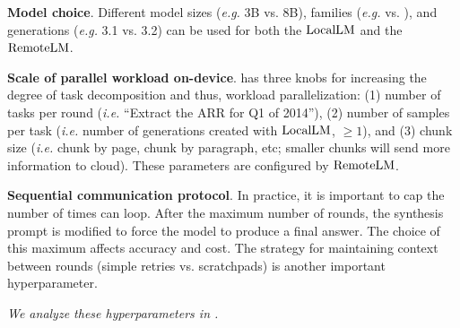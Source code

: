 \textbf{Model choice}. Different model sizes (\textit{e.g.} 3B vs. 8B), families (\textit{e.g.} \qwen vs. \llama), and generations (\textit{e.g.} 3.1 vs. 3.2) can be used for both the $\mathrm{LocalLM}$ and the $\mathrm{RemoteLM}$. 

\textbf{Scale of parallel workload on-device}. \system has three knobs for increasing the degree of task decomposition and thus, workload parallelization: (1) number of tasks per round (\textit{i.e.} ``Extract the ARR for Q1 of 2014''), (2) number of samples per task (\textit{i.e.} number of generations created with $\mathrm{LocalLM}$, $\geq 1$), and (3) chunk size (\textit{i.e.} chunk by page, chunk by paragraph, etc; smaller chunks will send more information to cloud). These parameters are configured by $\mathrm{RemoteLM}$.

\textbf{Sequential communication protocol}. 
In practice, it is important to cap the number of times \system can loop. 
After the maximum number of rounds, the synthesis prompt is modified to force the model to produce a final answer. The choice of this maximum affects accuracy and cost. The strategy for maintaining context between rounds (simple retries vs. scratchpads) is another important hyperparameter.

\textit{We analyze these hyperparameters in .}


